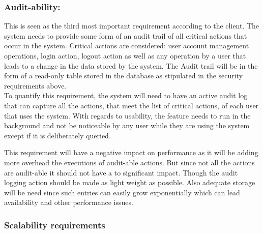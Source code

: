 \vspace{0.1in}

\subsubsection{Audit-ability:}

\begin{flushleft}

This is seen as the third most important requirement according to the client. The system needs to provide some form of an audit trail of all critical actions that occur in the system. Critical actions are considered: user account management operations, login action, logout action as well as any operation by a user that leads to a change in the data stored by the system. The Audit trail will be in the form of a read-only table stored in the database as stipulated in the security requirements above.\\

To quantify this requirement, the system will need to have an active audit log that can capture all the actions, that meet the list of critical actions, of each user that uses the system. With regards to usability, the feature needs to run in the background and not be noticeable by any user while they are using the system except if it is deliberately queried.

\vspace{0.1in}
This requirement will have a negative impact on performance as it will be adding more overhead the executions of audit-able actions. But since not all the actions are audit-able it should not have a to significant impact. Though the audit logging action should be made as light weight as possible. Also adequate storage will be need since such entries can easily grow exponentially which can lead availability and other performance issues.  

\vspace{0.1in}

\end{flushleft}

\subsubsection{Scalability requirements}

